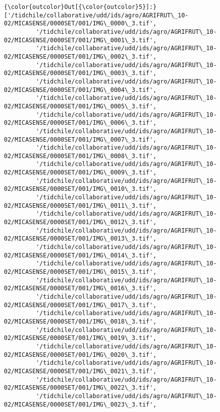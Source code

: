 \documentclass[11pt]{article}
\begin{document}
\begin{Verbatim}[commandchars=\\\{\}]
{\color{outcolor}Out[{\color{outcolor}5}]:} ['/tidchile/collaborative/udd/ids/agro/AGRIFRUT\_10-02/MICASENSE/0000SET/001/IMG\_0000\_3.tif',
         '/tidchile/collaborative/udd/ids/agro/AGRIFRUT\_10-02/MICASENSE/0000SET/001/IMG\_0001\_3.tif',
         '/tidchile/collaborative/udd/ids/agro/AGRIFRUT\_10-02/MICASENSE/0000SET/001/IMG\_0002\_3.tif',
         '/tidchile/collaborative/udd/ids/agro/AGRIFRUT\_10-02/MICASENSE/0000SET/001/IMG\_0003\_3.tif',
         '/tidchile/collaborative/udd/ids/agro/AGRIFRUT\_10-02/MICASENSE/0000SET/001/IMG\_0004\_3.tif',
         '/tidchile/collaborative/udd/ids/agro/AGRIFRUT\_10-02/MICASENSE/0000SET/001/IMG\_0005\_3.tif',
         '/tidchile/collaborative/udd/ids/agro/AGRIFRUT\_10-02/MICASENSE/0000SET/001/IMG\_0006\_3.tif',
         '/tidchile/collaborative/udd/ids/agro/AGRIFRUT\_10-02/MICASENSE/0000SET/001/IMG\_0007\_3.tif',
         '/tidchile/collaborative/udd/ids/agro/AGRIFRUT\_10-02/MICASENSE/0000SET/001/IMG\_0008\_3.tif',
         '/tidchile/collaborative/udd/ids/agro/AGRIFRUT\_10-02/MICASENSE/0000SET/001/IMG\_0009\_3.tif',
         '/tidchile/collaborative/udd/ids/agro/AGRIFRUT\_10-02/MICASENSE/0000SET/001/IMG\_0010\_3.tif',
         '/tidchile/collaborative/udd/ids/agro/AGRIFRUT\_10-02/MICASENSE/0000SET/001/IMG\_0011\_3.tif',
         '/tidchile/collaborative/udd/ids/agro/AGRIFRUT\_10-02/MICASENSE/0000SET/001/IMG\_0012\_3.tif',
         '/tidchile/collaborative/udd/ids/agro/AGRIFRUT\_10-02/MICASENSE/0000SET/001/IMG\_0013\_3.tif',
         '/tidchile/collaborative/udd/ids/agro/AGRIFRUT\_10-02/MICASENSE/0000SET/001/IMG\_0014\_3.tif',
         '/tidchile/collaborative/udd/ids/agro/AGRIFRUT\_10-02/MICASENSE/0000SET/001/IMG\_0015\_3.tif',
         '/tidchile/collaborative/udd/ids/agro/AGRIFRUT\_10-02/MICASENSE/0000SET/001/IMG\_0016\_3.tif',
         '/tidchile/collaborative/udd/ids/agro/AGRIFRUT\_10-02/MICASENSE/0000SET/001/IMG\_0017\_3.tif',
         '/tidchile/collaborative/udd/ids/agro/AGRIFRUT\_10-02/MICASENSE/0000SET/001/IMG\_0018\_3.tif',
         '/tidchile/collaborative/udd/ids/agro/AGRIFRUT\_10-02/MICASENSE/0000SET/001/IMG\_0019\_3.tif',
         '/tidchile/collaborative/udd/ids/agro/AGRIFRUT\_10-02/MICASENSE/0000SET/001/IMG\_0020\_3.tif',
         '/tidchile/collaborative/udd/ids/agro/AGRIFRUT\_10-02/MICASENSE/0000SET/001/IMG\_0021\_3.tif',
         '/tidchile/collaborative/udd/ids/agro/AGRIFRUT\_10-02/MICASENSE/0000SET/001/IMG\_0022\_3.tif',
         '/tidchile/collaborative/udd/ids/agro/AGRIFRUT\_10-02/MICASENSE/0000SET/001/IMG\_0023\_3.tif',

\end{Verbatim}
\end{document}
